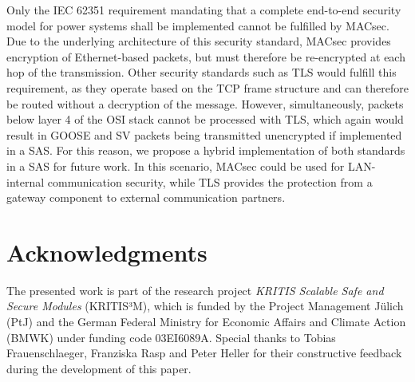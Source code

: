 \documentclass[conference, onecolumn, a4paper]{IEEEtran}
\begin{document}
\smallskip
Only the IEC 62351 requirement mandating that a complete end-to-end security model for power systems shall be implemented \cite{Review_IEC62351:2019} cannot 
be fulfilled by MACsec. Due to the underlying architecture of this security standard, MACsec provides encryption of Ethernet-based packets, but must therefore 
be re-encrypted at each hop of the transmission. Other security standards such as TLS would fulfill this requirement, as they operate based on the TCP 
frame structure and can therefore be routed without a decryption of the message. However, simultaneously, packets below layer 4 of the OSI stack cannot 
be processed with TLS, which again would result in GOOSE and SV packets being transmitted unencrypted if implemented in a SAS. For this reason, we propose 
a hybrid implementation of both standards in a SAS for future work. In this scenario, MACsec could be used for LAN-internal communication security, while 
TLS provides the protection from a gateway component to external communication partners.    

\section{Acknowledgments}
\noindent The presented work is part of the research project \emph{KRITIS Scalable Safe and Secure Modules} (KRITIS³M), which is funded by the Project 
Management Jülich (PtJ) and the German Federal Ministry for Economic Affairs and Climate Action (BMWK) under funding code 03EI6089A. Special thanks to 
Tobias Frauenschlaeger, Franziska Rasp and Peter Heller for their constructive feedback during the development of this paper.
\printbibliography
\end{document}
